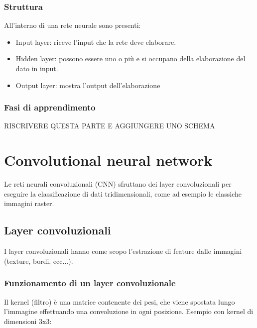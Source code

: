 \subsubsection{Struttura}
All'interno di una rete neurale sono presenti:
\begin{itemize}
    \item Input layer: riceve l'input che la rete deve elaborare.
    \item Hidden layer: possono essere uno o più e si occupano della elaborazione del dato in input.
    \item Output layer: mostra l'output dell'elaborazione
\end{itemize}

\subsubsection{Fasi di apprendimento} RISCRIVERE QUESTA PARTE E AGGIUNGERE UNO SCHEMA 

\section{Convolutional neural network}
Le reti neurali convoluzionali (CNN) sfruttano dei layer convoluzionali per eseguire la classificazione di dati tridimensionali, come ad esempio le classiche immagini raster.
\subsection{Layer convoluzionali}
I layer convoluzionali hanno come scopo l'estrazione di feature dalle immagini (texture, bordi, ecc...).
\subsubsection{Funzionamento di un layer convoluzionale}
Il kernel (filtro) è una matrice contenente dei pesi, che viene spostata lungo l'immagine effettuando una convoluzione in ogni posizione.
Esempio con kernel di dimensioni 3x3:

